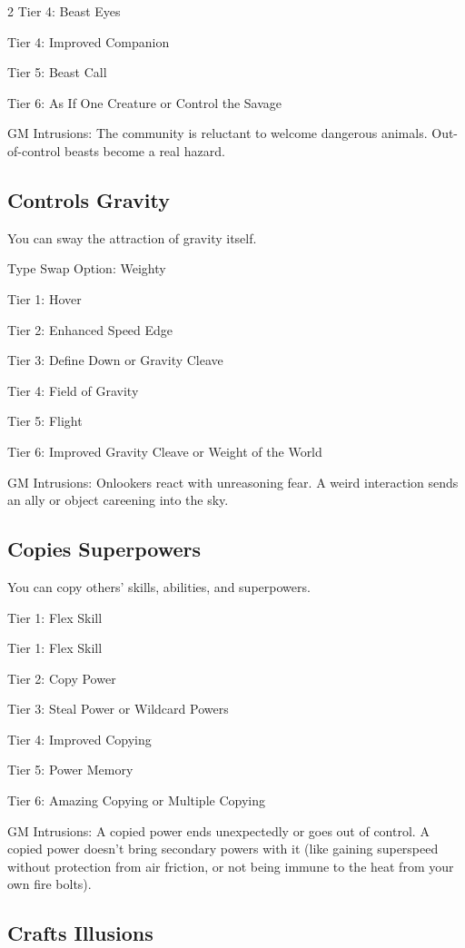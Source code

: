 \begin{multicols}{2}
Tier 4: Beast Eyes

Tier 4: Improved Companion

Tier 5: Beast Call

Tier 6: As If One Creature or Control the Savage

GM Intrusions: The community is reluctant to welcome dangerous animals. Out-of-control beasts become a real hazard.

\subsection{Controls Gravity}

You can sway the attraction of gravity itself.

Type Swap Option: Weighty

Tier 1: Hover

Tier 2: Enhanced Speed Edge

Tier 3: Define Down or Gravity Cleave

Tier 4: Field of Gravity

Tier 5: Flight

Tier 6: Improved Gravity Cleave or Weight of the World

GM Intrusions: Onlookers react with unreasoning fear. A weird interaction sends an ally or object careening into the sky.

\subsection{Copies Superpowers}

You can copy others’ skills, abilities, and superpowers.

Tier 1: Flex Skill 

Tier 1: Flex Skill 

Tier 2: Copy Power

Tier 3: Steal Power or Wildcard Powers

Tier 4: Improved Copying

Tier 5: Power Memory

Tier 6: Amazing Copying or Multiple Copying 

GM Intrusions: A copied power ends unexpectedly or goes out of control. A copied power doesn’t bring secondary powers with it (like gaining superspeed without protection from air friction, or not being immune to the heat from your own fire bolts).

\subsection{Crafts Illusions}


\end{multicols}
